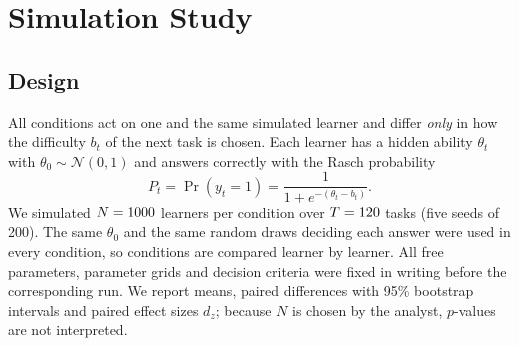 
\section{Simulation Study}
\label{sec:sim}

\subsection{Design}
All conditions act on one and the same simulated learner and differ \emph{only} in how the difficulty $b_t$ of the next task is chosen. Each learner has a hidden ability $\theta_t$ with $\theta_0 \sim \mathcal{N}(0,1)$ and answers correctly with the Rasch probability \cite{rasch1960probabilistic}
\begin{equation}
P_t = \Pr(y_t = 1) = \frac{1}{1 + e^{-(\theta_t - b_t)}} .
\end{equation}
We simulated $N = 1000$ learners per condition over $T = 120$ tasks (five seeds of 200). The same $\theta_0$ and the same random draws deciding each answer were used in every condition, so conditions are compared learner by learner. All free parameters, parameter grids and decision criteria were fixed in writing before the corresponding run. We report means, paired differences with 95\% bootstrap intervals and paired effect sizes $d_z$; because $N$ is chosen by the analyst, $p$-values are not interpreted.

